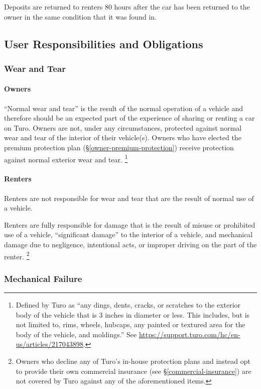 \documentclass[review,12pt]{elsarticle}
\begin{document}
Deposits are returned to renters 80 hours after the car has been returned to the owner in the same condition that it was found in.

\subsection{User Responsibilities and Obligations}
  \subsubsection{Wear and Tear}
    \paragraph{Owners}
    ``Normal wear and tear'' is the result of the normal operation of a vehicle and therefore should be an expected part of the experience of sharing or renting a car on Turo. Owners are not, under any circumstances, protected against normal wear and tear of the interior of their vehicle(s). Owners who have elected the premium protection plan (\S\ref{owner-premium-protection}) receive protection against normal exterior wear and tear.
      \footnote{Defined by Turo as ``any dings, dents, cracks, or scratches to the exterior body of the vehicle that is 3 inches in diameter or less. This includes, but is not limited to, rims, wheels, hubcaps, any painted or textured area for the body of the vehicle, and moldings.'' See \url{https://support.turo.com/hc/en-us/articles/217043898}.
      }
    \paragraph{Renters}
    Renters are not responsible for wear and tear that are the result of normal use of a vehicle.

    Renters are fully responsible for damage that is the result of misuse or prohibited use of a vehicle, ``significant damage'' to the interior of a vehicle, and mechanical damage due to negligence, intentional acts, or improper driving on the part of the renter.
      \footnote{Owners who decline any of Turo's in-house protection plans and instead opt to provide their own commercial insurance (see \S\ref{commercial-insurance}) are not covered by Turo against any of the aforementioned items.
      }

  \subsubsection{Mechanical Failure}
\end{document}
